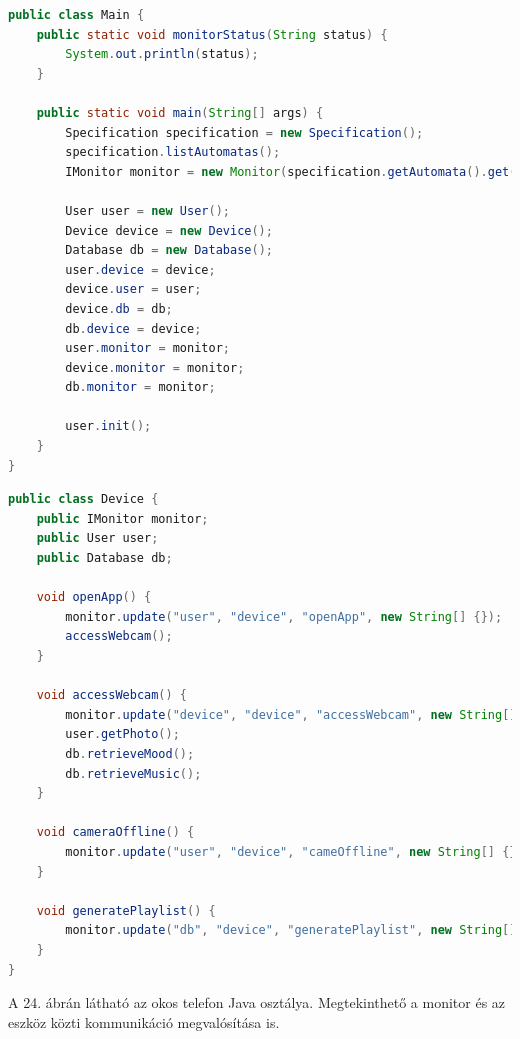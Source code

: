 \begin{lstlisting}[language=java, frame=single, float=ht!, caption={Az okos telefon és hozzá tartozó monitor összecsatolásának Java implementációja.},captionpos=b]
public class Main {
	public static void monitorStatus(String status) {
		System.out.println(status);
	}

	public static void main(String[] args) {
		Specification specification = new Specification();
		specification.listAutomatas();
		IMonitor monitor = new Monitor(specification.getAutomata().get(0));

		User user = new User();
		Device device = new Device();
		Database db = new Database();
		user.device = device;
		device.user = user;
		device.db = db;
		db.device = device;
		user.monitor = monitor;
		device.monitor = monitor;
		db.monitor = monitor;

		user.init();
	}
}
\end{lstlisting}

\begin{lstlisting}[language=java, frame=single, float=ht!, caption={Az okos telefon Java osztálya.},captionpos=b]
public class Device {
	public IMonitor monitor;
	public User user;
	public Database db;

	void openApp() {
		monitor.update("user", "device", "openApp", new String[] {});
		accessWebcam();
	}

	void accessWebcam() {
		monitor.update("device", "device", "accessWebcam", new String[] {});
		user.getPhoto();
		db.retrieveMood();
		db.retrieveMusic();
	}

	void cameraOffline() {
		monitor.update("user", "device", "cameOffline", new String[] {});
	}

	void generatePlaylist() {
		monitor.update("db", "device", "generatePlaylist", new String[] {});
	}
}
\end{lstlisting}

A 24. ábrán látható az okos telefon Java osztálya. Megtekinthető a monitor és az eszköz közti kommunikáció megvalósítása is.

